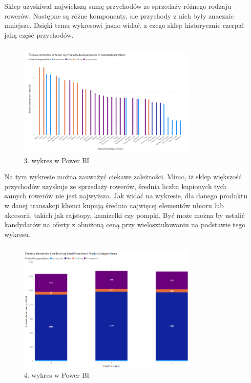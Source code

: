 \documentclass[a4paper,12pt]{article}
\begin{document}
Sklep uzyskiwał największą sumę przychodów ze sprzedaży różnego rodzaju rowerów. Następne są różne komponenty, ale przychody z nich były znacznie mniejsze. Dzięki temu wykresowi jasno widać, z czego sklep historycznie czerpał jaką część przychodów.

\subsubsection{}

\begin{figure}[H]
    \centering
    \includegraphics[width=0.8\textwidth]{images/power_bi/03.png}
    \caption{3. wykres w Power BI}
\end{figure}

Na tym wykresie można zauważyć ciekawe zależności. Mimo, iż sklep większość przychodów uzyskuje ze sprzedaży rowerów, średnia liczba kupionych tych samych rowerów nie jest najwyższa. Jak widać na wykresie, dla danego produktu w danej transakcji klienci kupują średnio najwięcej elementów ubioru lub akcesorii, takich jak rajstopy, kamizelki czy pompki. Być może można by ustalić kandydatów na oferty z obniżoną ceną przy wielosztukowaniu na podstawie tego wykresu.

\subsubsection{}

\begin{figure}[H]
    \centering
    \includegraphics[width=0.8\textwidth]{images/power_bi/04.png}
    \caption{4. wykres w Power BI}
\end{figure}
\end{document}
